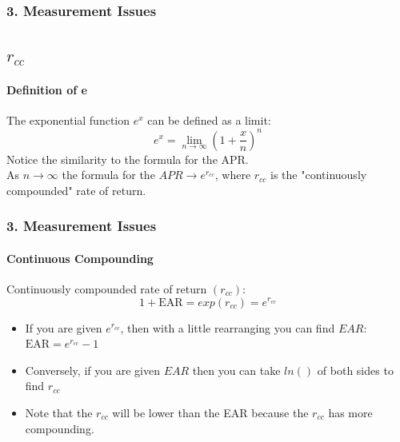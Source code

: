 \documentclass{beamer}
\begin{document}
\begin{frame}[t]
    \frametitle{3. Measurement Issues}
    \subsection{$r_{cc}$}
    \framesubtitle{Definition of e}

        The exponential function $e^x$ can be defined as a limit:
    \[
        e^x = \lim_{n \to \infty} \left(1 + \frac{x}{n}\right)^n
    \]
    Notice the similarity to the formula for the APR.\\
    \vspace{1em}
    As $n \to \infty$ the formula for the $APR \to e^{r_{cc}}$, 
    where $r_{cc}$ is the "continuously compounded" rate of return.

\end{frame}    

\begin{frame}[t]
    \frametitle{3. Measurement Issues}
    \framesubtitle{Continuous Compounding}

    Continuously compounded rate of return $(r_{cc})$:
    $$1 + \text{EAR} = exp(r_{cc}) = e^{r_{cc}}$$
    
    \begin{itemize}
        \item If you are given $e^{r_{cc}}$, then with a little rearranging you can find $EAR$: $\text{EAR} = e^{r_{cc}} - 1$
        \item Conversely, if you are given $EAR$ then you can take $ln()$ of both sides to find $r_{cc}$
        \item Note that the $r_{cc}$ will be lower than the EAR because the $r_{cc}$ has more compounding.
    \end{itemize}
    \vspace{1em}

\end{frame}
\end{document}
